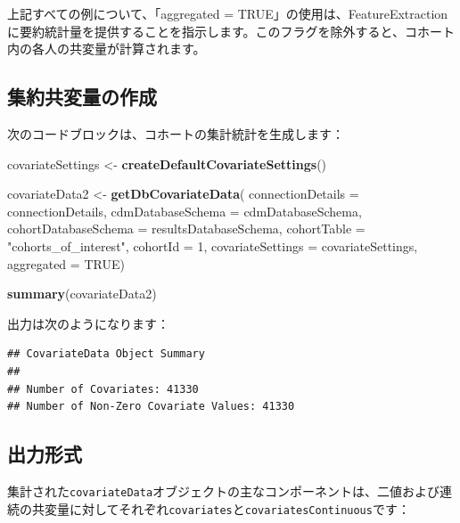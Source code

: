 \documentclass[
  11pt]{book}
\makeatletter
\newenvironment{Shaded}{\begin{snugshade}}{\end{snugshade}}
\newcommand{\AttributeTok}[1]{\textcolor[rgb]{0.13,0.29,0.53}{#1}}
\newcommand{\ConstantTok}[1]{\textcolor[rgb]{0.56,0.35,0.01}{#1}}
\newcommand{\DecValTok}[1]{\textcolor[rgb]{0.00,0.00,0.81}{#1}}
\newcommand{\FunctionTok}[1]{\textcolor[rgb]{0.13,0.29,0.53}{\textbf{#1}}}
\newcommand{\NormalTok}[1]{#1}
\newcommand{\OtherTok}[1]{\textcolor[rgb]{0.56,0.35,0.01}{#1}}
\newcommand{\StringTok}[1]{\textcolor[rgb]{0.31,0.60,0.02}{#1}}
\newenvironment{kframe}{%
\medskip{}
\setlength{\fboxsep}{.8em}
 \def\at@end@of@kframe{}%
 \ifinner\ifhmode%
  \def\at@end@of@kframe{\end{minipage}}%
  \begin{minipage}{\columnwidth}%
 \fi\fi%
 \def\FrameCommand##1{\hskip\@totalleftmargin \hskip-\fboxsep
 \colorbox{myShadeColor}{##1}\hskip-\fboxsep
     \hskip-\linewidth \hskip-\@totalleftmargin \hskip\columnwidth}%
 \MakeFramed {\advance\hsize-\width
   \@totalleftmargin\z@ \linewidth\hsize
   \@setminipage}}%
 {\par\unskip\endMakeFramed%
 \at@end@of@kframe}
\newenvironment{rmdblock}[1]
  {
  \begin{itemize}
  \renewcommand{\labelitemi}{
    \raisebox{-.7\height}[0pt][0pt]{
      {\setkeys{Gin}{width=3em,keepaspectratio}\texttt{[image: images/\#1]}}
    }
  }
  \setlength{\fboxsep}{1em}
  \begin{kframe}
  \item
  }
  {
  \end{kframe}
  \end{itemize}
  }
\newenvironment{rmdimportant}
  {\begin{rmdblock}{important}}
  {\end{rmdblock}}
\theoremstyle{definition}
\theoremstyle{definition}
\theoremstyle{definition}
\theoremstyle{definition}
\theoremstyle{remark}
\makeatother
\begin{document}
\begin{rmdimportant}
上記すべての例について、「aggregated = TRUE」の使用は、FeatureExtractionに要約統計量を提供することを指示します。このフラグを除外すると、コホート内の各人の共変量が計算されます。
\end{rmdimportant}

\subsection{集約共変量の作成}\label{ux96c6ux7d04ux5171ux5909ux91cfux306eux4f5cux6210}

次のコードブロックは、コホートの集計統計を生成します：

\begin{Shaded}
\begin{Highlighting}[]
\NormalTok{covariateSettings }\OtherTok{\textless{}{-}} \FunctionTok{createDefaultCovariateSettings}\NormalTok{()}

\NormalTok{covariateData2 }\OtherTok{\textless{}{-}} \FunctionTok{getDbCovariateData}\NormalTok{(}
  \AttributeTok{connectionDetails =}\NormalTok{ connectionDetails,}
  \AttributeTok{cdmDatabaseSchema =}\NormalTok{ cdmDatabaseSchema,}
  \AttributeTok{cohortDatabaseSchema =}\NormalTok{ resultsDatabaseSchema,}
  \AttributeTok{cohortTable =} \StringTok{"cohorts\_of\_interest"}\NormalTok{,}
  \AttributeTok{cohortId =} \DecValTok{1}\NormalTok{,}
  \AttributeTok{covariateSettings =}\NormalTok{ covariateSettings,}
  \AttributeTok{aggregated =} \ConstantTok{TRUE}\NormalTok{)}

\FunctionTok{summary}\NormalTok{(covariateData2)}
\end{Highlighting}
\end{Shaded}

出力は次のようになります：

\begin{verbatim}
## CovariateData Object Summary
##
## Number of Covariates: 41330
## Number of Non-Zero Covariate Values: 41330
\end{verbatim}

\subsection{出力形式}\label{ux51faux529bux5f62ux5f0f}

集計された\texttt{covariateData}オブジェクトの主なコンポーネントは、二値および連続の共変量に対してそれぞれ\texttt{covariates}と\texttt{covariatesContinuous}です：
\end{document}
